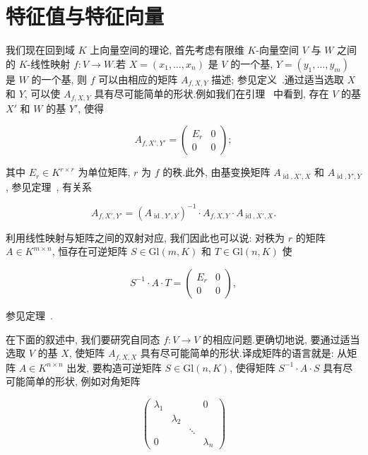 \section{特征值与特征向量}\label{sec:6.1}

我们现在回到域 $K$ 上向量空间的理论, 首先考虑有限维 $K$-向量空间 $V$ 与 $W$ 之间的 $K$-线性映射 $f \colon V \longrightarrow W$.若 $X = (x_1, \ldots, x_n)$ 是 $V$ 的一个基, $Y = (y_1, \ldots, y_m)$ 是 $W$ 的一个基, 则 $f$ 可以由相应的矩阵 $A_{f, X, Y}$ 描述; 参见定义~.通过适当选取 $X$ 和 $Y$, 可以使 $A_{f, X, Y}$ 具有尽可能简单的形状.例如我们在引理~ 中看到, 存在 $V$ 的基 $X'$ 和 $W$ 的基 $Y'$, 使得

\[
A_{f, X', Y'} = \left(\begin{array}{cc} E_r & 0 \\ 0 & 0 \end{array}\right);\]

其中 $E_r \in K^{r \times r}$ 为单位矩阵, $r$ 为 $f$ 的秩.此外, 由基变换矩阵 $A_{\operatorname{id}, X', X}$ 和 $A_{\operatorname{id}, Y', Y}$, 参见定理~, 有关系

\[
A_{f, X', Y'} = (A_{\operatorname{id}, Y', Y})^{-1} \cdot A_{f, X, Y} \cdot A_{\operatorname{id}, X', X}\text{.}\]

利用线性映射与矩阵之间的双射对应, 我们因此也可以说: 对秩为 $r$ 的矩阵 $A \in K^{m \times n}$, 恒存在可逆矩阵 $S \in \mathrm{Gl}(m, K)$ 和 $T \in \mathrm{Gl}(n, K)$ 使

\[
S^{-1} \cdot A \cdot T = \left(\begin{array}{cc} E_r & 0 \\ 0 & 0 \end{array}\right),\]

参见定理~.

在下面的叙述中, 我们要研究自同态 $f \colon V \longrightarrow V$ 的相应问题.更确切地说, 要通过适当选取 $V$ 的基 $X$, 使矩阵 $A_{f, X, X}$ 具有尽可能简单的形状.译成矩阵的语言就是: 从矩阵 $A \in K^{n \times n}$ 出发, 要构造可逆矩阵 $S \in \mathrm{Gl}(n, K)$, 使得矩阵 $S^{-1} \cdot A \cdot S$ 具有尽可能简单的形状, 例如对角矩阵

\[
\left(\begin{array}{cccc}
\lambda_1 & & & 0 \\
 & \lambda_2 & & \\
 & & \ddots & \\
0 & & & \lambda_n
\end{array}\right)\]

